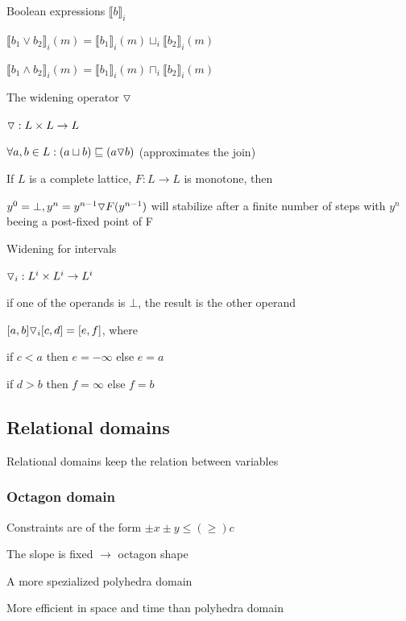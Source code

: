 	\enumend
	\item Boolean expressions $\llbracket b\rrbracket_i$
	\enumstart
		\item $\llbracket b_1 \lor b_2 \rrbracket_i(m) = \llbracket b_1 \rrbracket_i(m) \sqcup_i \llbracket b_2\rrbracket_i(m)$
		\item $\llbracket b_1 \land b_2 \rrbracket_i(m) = \llbracket b_1 \rrbracket_i(m) \sqcap_i \llbracket b_2\rrbracket_i(m)$
	\enumend
	\item The widening operator $\triangledown$
	\enumstart
		\item $\triangledown: L \times L \rightarrow L$
		\item $\forall a, b \in L: (a \sqcup b) \sqsubseteq (a \triangledown b)$ (approximates the join)
		\item If $L$ is a complete lattice, $F: L \rightarrow L$ is monotone, then
		\item $y^0 = \bot, y^n = y^{n-1} \triangledown F(y^{n-1})$ will stabilize after a finite number of steps with $y^n$ beeing a post-fixed point of F
	\enumend
	\item Widening for intervals
	\enumstart
		\item $\triangledown_i: L^i \times L^i \rightarrow L^i$
		\item if one of the operands is $\bot$, the result is the other operand
		\item $[a,b] \triangledown_i [c,d] = [e,f]$, where
		\enumstart
			\item if $c < a$ then $e = -\infty$ else $e = a$
			\item if $d > b$ then $f = \infty$ else $f = b$
		\enumend
	\enumend
\enumend

\subsection{Relational domains}
\enumstart
	\item Relational domains keep the relation between variables
\enumend

\subsubsection{Octagon domain}
\enumstart
	\item Constraints are of the form $\pm x \pm y \le(\ge) c$
	\item The slope is fixed $\rightarrow$ octagon shape
	\item A more spezialized polyhedra domain
	\item More efficient in space and time than polyhedra domain
\enumend

